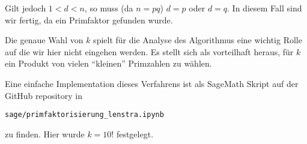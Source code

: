 Gilt jedoch $1<d<n$, so muss (da $n=pq$) $d=p$ oder $d=q$. In diesem
Fall sind wir fertig, da ein Primfaktor gefunden wurde.

\bigskip

Die genaue Wahl von $k$ spielt für die Analyse des Algorithmus eine
wichtig Rolle auf die wir hier nicht eingehen werden. Es stellt sich
als vorteilhaft heraus, für $k$ ein Produkt von vielen ``kleinen''
Primzahlen zu wählen.

Eine einfache Implementation dieses Verfahrens ist als SageMath Skript
auf der GitHub repository in
\begin{center}
\texttt{sage/primfaktorisierung\_lenstra.ipynb}  
\end{center}
 zu finden. Hier wurde $k=10!$ festgelegt.






